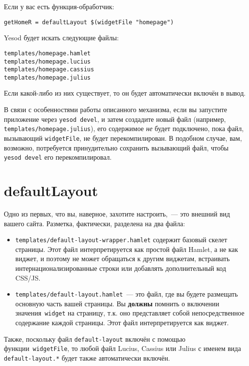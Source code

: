 Если у вас есть функция-обработчик:
\begin{lstlisting}
getHomeR = defaultLayout $(widgetFile "homepage")
\end{lstlisting}%
Yesod будет искать следующие файлы:
\begin{lstlisting}
templates/homepage.hamlet
templates/homepage.lucius
templates/homepage.cassius
templates/homepage.julius
\end{lstlisting}

Если какой-либо из них существует, то он будет автоматически включён в вывод.

\begin{remark}
В связи с особенностями работы описанного механизма, если вы запустите приложение
через \texttt{yesod devel}, и затем создадите новый файл (например,
\texttt{templates/homepage.julius}), его содержимое \emph{не} будет подключено,
пока файл, вызывающий \lstinline!widgetFile!, не будет перекомпилирован.  В
подобном случае, вам, возможно, потребуется принудительно сохранить вызывающий файл,
чтобы \texttt{yesod devel} его перекомпилировал.
\end{remark}

\section{defaultLayout}
Одно из первых, что вы, наверное, захотите настроить,~--- это внешний вид вашего
сайта. Разметка, фактически, разделена на два файла:
\begin{itemize}
  \item \texttt{templates/default-layout-wrapper.hamlet} содержит базовый скелет
      страницы. Этот файл интерпретируется как простой файл Hamlet, а не как
      виджет, и поэтому не может обращаться к другим виджетам, встраивать
      интернационализированные строки или добавлять дополнительный код CSS/JS.
  \item \texttt{templates/default-layout.hamlet}~--- это файл, где вы будете
      размещать основную часть вашей страницы. Вы \textbf{должны} помнить о
      включении значения~\lstinline!widget! на страницу, т.к. оно представляет
      собой непосредственное содержание каждой страницы. Этот файл
      интерпретируется как виджет.
\end{itemize}

Также, поскольку файл \texttt{default-layout} включён с помощью
функции~\lstinline!widgetFile!, то любой файл Lucius, Cassius или Julius с
именем вида \texttt{default-layout.*} будет также автоматически включён.


